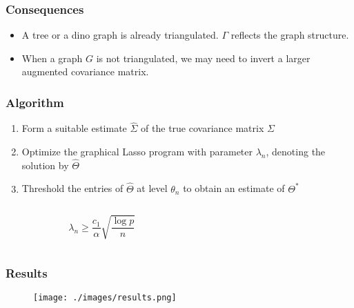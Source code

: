 \documentclass{beamer}
\begin{document}
\begin{frame}
\frametitle{Consequences}
\begin{itemize}
\item A tree or a dino graph is already triangulated. $\Gamma$ reflects the
graph structure.
\item When a graph $G$ is not triangulated, we may need to invert a larger
augmented covariance matrix.
\end{itemize}
\end{frame}

\begin{frame}
\frametitle{Algorithm}

\begin{enumerate}
\item Form a suitable estimate $\hat{\Sigma}$ of the true covariance matrix
$\Sigma$
\item Optimize the graphical Lasso program with parameter $\lambda_n$,
denoting the solution by $\hat{\Theta}$
\item Threshold the entries of $\hat{\Theta}$ at level $\theta_n$ to obtain an
estimate of $\Theta^*$
\end{enumerate}

\begin{columns}
\begin{column}{0.5 \textwidth}
\begin{equation*}
\lambda_n \geq \frac{c_1}{\alpha} \sqrt{\frac{\log p}{n}}
\end{equation*}
\end{column}
\begin{column}{0.5 \textwidth}
\end{column}

\begin{equation}
\end{equation}
\end{columns}

\end{frame}


\begin{frame}
\frametitle{Results}

\begin{figure}
\texttt{[image: ./images/results.png]}
\end{figure}
\end{frame}
\end{document}
